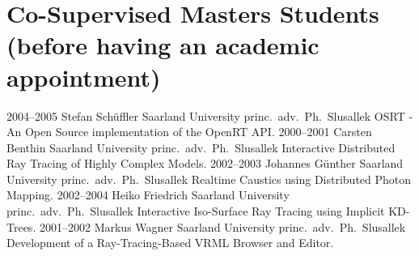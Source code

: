 \documentclass[letterpaper,11pt]{moderncv}
\begin{document}
\closesection
\section{Co-Supervised Masters Students {\small (before having an academic appointment)}}
\cventry
{2004--2005}
{Stefan Sch\"uffler}
{Saarland University}
{princ.\ adv.\ Ph.\ Slusallek}{}
{OSRT - An Open Source implementation of the OpenRT API.}
\cventry
{2000--2001}
{Carsten Benthin}
{Saarland University}
{princ.\ adv.\ Ph.\ Slusallek}{}
{Interactive {Distributed} {Ray} {Tracing} of {Highly} {Complex} {Models}.}
\cventry
{2002--2003}
{Johannes G\"unther}
{Saarland University}
{princ.\ adv.\ Ph.\ Slusallek}{}
{{Realtime} {Caustics} {using} {Distributed} {Photon} {Mapping}.}
\cventry
{2002--2004}
{Heiko Friedrich}
{Saarland University}
{princ.\ adv.\ Ph.\ Slusallek}{}
{Interactive Iso-Surface Ray Tracing using Implicit KD-Trees.}
\cventry
{2001--2002}
{Markus Wagner}
{Saarland University}
{princ.\ adv.\ Ph.\ Slusallek}{}
{Development of a {Ray-Tracing-Based} {VRML} {Browser} and {Editor}.}



\closesection
\fi
\end{document}
